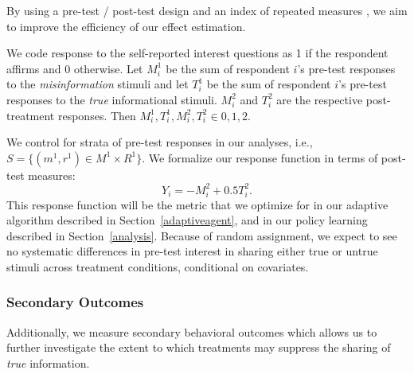 \documentclass[letterpaper, 12pt, parskip=full,]{scrartcl}
\begin{document}
By using a pre-test / post-test design  \citep{davidian2005semiparametric} %
and an index of repeated measures \citep{broockman2017design}, we aim to improve the efficiency of our effect estimation. 


We code response to the self-reported interest questions as 1 if the respondent affirms and 0 otherwise. Let $M_i^1$ be the sum of respondent $i$'s pre-test responses to the \textit{misinformation} stimuli and let $T_i^1$ be the sum of respondent $i$'s pre-test responses to the \textit{true} informational stimuli. $M_i^2$ and $T_i^2$ are the respective post-treatment responses. Then $M_i^1, T_i^1, M_i^2, T_i^2 \in {0,1,2}$. 

We control for strata of pre-test responses in our analyses, i.e., $S=\{(m^1, r^1)\in M^1 \times R^1\}$. 
We formalize our response function in terms of post-test measures:
\[
Y_i = -M^2_i + 0.5 T^2_i.
\]
This response function will be the metric that we optimize for in our adaptive algorithm described in Section~\ref{adaptiveagent}, and in our policy learning described in Section~\ref{analysis}. Because of random assignment, we expect to see no systematic differences in pre-test interest in sharing either true or untrue stimuli across treatment conditions, conditional on covariates. %




\subsubsection{Secondary Outcomes}
Additionally, we measure secondary behavioral outcomes which allows us to further investigate the extent to which treatments may suppress the sharing of \textit{true} information.
\end{document}
